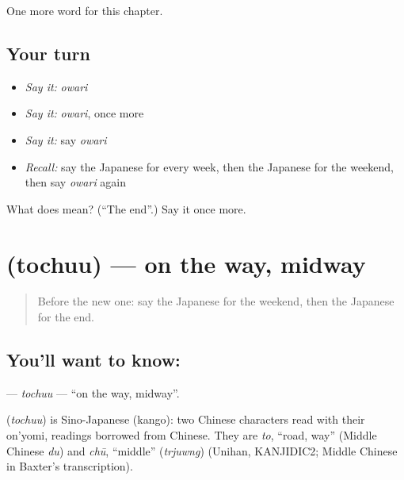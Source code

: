 \begin{grammarlens}[title={What you've built}]
One more word for this chapter.
\end{grammarlens}

\subsection*{Your turn}
\begin{itemize}
\raggedright
  \item \emph{Say it:} \emph{owari}
  \item \emph{Say it:} \emph{owari}, once more
  \item \emph{Say it:} say \emph{owari}
  \item \emph{Recall:} say the Japanese for every week, then the Japanese for the weekend, then say \emph{owari} again
\end{itemize}

\begin{tcolorbox}[breakable,colback=teal!4,colframe=teal!35!black,title={Before you move on}]
What does  mean? (\textquotedblleft{}The end\textquotedblright{}.) Say it once more.
\end{tcolorbox}
\section[\texorpdfstring{\ja{とちゅう} (tochuu)}{とちゅう (tochuu)}]{ (tochuu) — on the way, midway}

\label{lesson:JA-C74-tochuu}



\begin{quote}
Before the new one: say the Japanese for the weekend, then the Japanese for the end.
\end{quote}

\subsection*{You'll want to know: }
\textbf{} — \emph{tochuu} — \textquotedblleft{}on the way, midway\textquotedblright{}.

\begin{cousinweb}
\textbf{} (\emph{tochuu}) is Sino-Japanese (kango): two Chinese characters read with their on'yomi, readings borrowed from Chinese. They are \emph{to}, \textquotedblleft{}road, way\textquotedblright{} (Middle Chinese \emph{du}) and \emph{chū}, \textquotedblleft{}middle\textquotedblright{} (\emph{trjuwng}) (Unihan, KANJIDIC2; Middle Chinese in Baxter's transcription).
\end{cousinweb}

